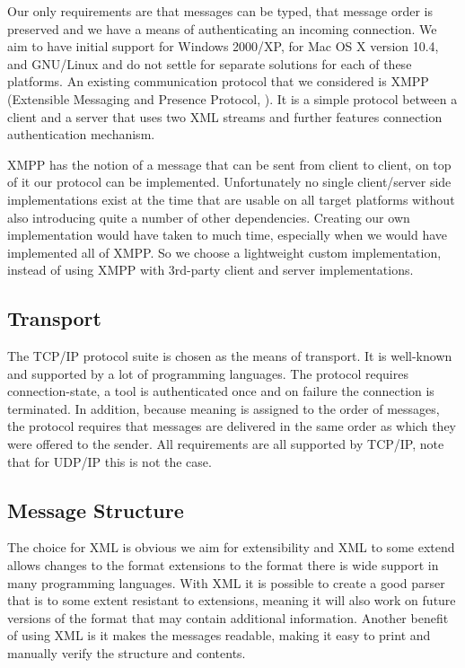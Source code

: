 \documentclass{article}
\begin{document}
   Our only requirements are that messages can be typed, that message order is
   preserved and we have a means of authenticating an incoming connection. We
   aim to have initial support for Windows 2000/XP, for Mac OS X version 10.4,
   and GNU/Linux and do not settle for separate solutions for each of these
   platforms. An existing communication protocol that we considered is XMPP
   (Extensible Messaging and Presence Protocol, \cite{rfc3920}). It is a
   simple protocol between a client and a server that uses two XML streams and
   further features connection authentication mechanism.

   XMPP has the notion of a message that can be sent from client to client, on
   top of it our protocol can be implemented.   Unfortunately no single
   client/server side implementations exist at the time that are usable on all
   target platforms without also introducing quite a number of other
   dependencies. Creating our own implementation would have taken to much time,
   especially when we would have implemented all of XMPP.  So we choose a lightweight
   custom implementation, instead of using XMPP with 3rd-party client and
   server implementations.

  \subsection{Transport}

   \noindent The TCP/IP protocol suite is chosen as the means of transport. It is
   well-known and supported by a lot of programming languages. The protocol
   requires connection-state, a tool is authenticated once and on failure the
   connection is terminated. In addition, because meaning is assigned to the
   order of messages, the protocol requires that messages are delivered in the
   same order as which they were offered to the sender. All requirements are
   all supported by TCP/IP, note that for UDP/IP this is not the case.

  \subsection{Message Structure}

   \noindent The choice for XML is obvious we aim for extensibility and XML to some
   extend allows changes to the format extensions to the format there is wide
   support in many programming languages. With XML it is possible to create a
   good parser that is to some extent resistant to extensions, meaning it will
   also work on future versions of the format that may contain additional
   information.  Another benefit of using XML is it makes the messages
   readable, making it easy to print and manually verify the structure and
   contents.
\end{document}
